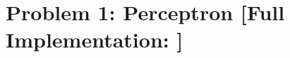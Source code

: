 \documentclass{tron}
\begin{document}
\maketitle
\tableofcontents
\clearpage
{}
\setcounter{page}{1}
\setlength{\parskip}{5pt}
\newpage


\newpage
\section{Problem 1: Perceptron [Full Implementation: ]}
\end{document}
